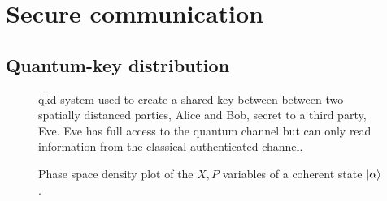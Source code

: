 \section{Secure communication}


\subsection{Quantum-key distribution}


\begin{figure}[htb]
	\centering
	
	\caption{\Gls{qkd} system used to create a shared key between between two spatially distanced parties, Alice and Bob, secret to a third party, Eve. Eve has full access to the quantum channel but can only read information from the classical authenticated channel.}
\end{figure}


\begin{figure}[htb]
	\centering
	
	\caption{Phase space density plot of the $X,P$ variables of a coherent state $\ket{\alpha}$.}
\end{figure}
